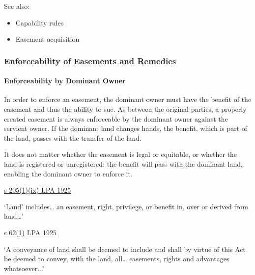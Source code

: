 \documentclass[
]{article}
\providecommand{\tightlist}{%
  \setlength{\itemsep}{0pt}\setlength{\parskip}{0pt}}
\newenvironment{env-9843ce55-0506-497d-95ba-03a690b05b3c}
{
    \savenotes\tcolorbox[blanker,breakable,left=5pt,borderline west={2pt}{-4pt}{green}]
}
{
    \endtcolorbox\spewnotes
}
\begin{document}
See also:

\begin{itemize}
\tightlist
\item
  Capability rules
\item
  Easement acquisition
\end{itemize}

\hypertarget{enforceability-of-easements-and-remedies}{%
\subsubsection{Enforceability of Easements and
Remedies}\label{enforceability-of-easements-and-remedies}}

\hypertarget{enforceability-by-dominant-owner}{%
\paragraph{Enforceability by Dominant
Owner}\label{enforceability-by-dominant-owner}}

In order to enforce an easement, the dominant owner must have the
benefit of the easement and thus the ability to sue. As between the
original parties, a properly created easement is always enforceable by
the dominant owner against the servient owner. If the dominant land
changes hands, the benefit, which is part of the land, passes with the
transfer of the land.

It does not matter whether the easement is legal or equitable, or
whether the land is registered or unregistered: the benefit will pass
with the dominant land, enabling the dominant owner to enforce it.

\begin{env-9843ce55-0506-497d-95ba-03a690b05b3c}

\href{https://www.legislation.gov.uk/ukpga/Geo5/15-16/20/section/205}{s
205(1)(ix) LPA 1925}

`Land' includes\ldots{} an easement, right, privilege, or benefit in,
over or derived from land\ldots'

\end{env-9843ce55-0506-497d-95ba-03a690b05b3c}

\begin{env-9843ce55-0506-497d-95ba-03a690b05b3c}

\href{https://www.legislation.gov.uk/ukpga/Geo5/15-16/20/section/62}{s
62(1) LPA 1925}

`A conveyance of land shall be deemed to include and shall by virtue of
this Act be deemed to convey, with the land, all\ldots{} easements,
rights and advantages whatsoever...'

\end{env-9843ce55-0506-497d-95ba-03a690b05b3c}
\end{document}
